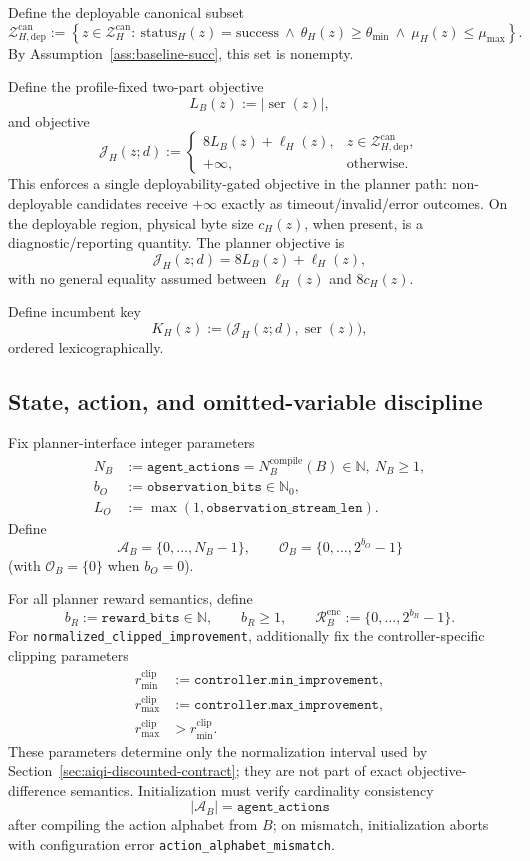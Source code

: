 \documentclass[11pt]{article}
\begin{document}
Define the deployable canonical subset
\[
\mathcal{Z}_{H,\mathrm{dep}}^{\mathrm{can}}:=
\left\{z\in\mathcal{Z}_H^{\mathrm{can}}:\ \mathrm{status}_H(z)=\mathrm{success}\ \land\ \theta_H(z)\ge\theta_{\min}\ \land\ \mu_H(z)\le\mu_{\max}\right\}.
\]
By Assumption~\ref{ass:baseline-succ}, this set is nonempty.

Define the profile-fixed two-part objective
\[
L_B(z):=\big|\operatorname{ser}(z)\big|,
\]
and objective
\[
\mathcal{J}_H(z;d):=
\begin{cases}
8L_B(z)+\ell_H(z),
& z\in\mathcal{Z}_{H,\mathrm{dep}}^{\mathrm{can}},\\[3pt]
+\infty,
& \text{otherwise.}
\end{cases}
\]
This enforces a single deployability-gated objective in the planner path:
non-deployable candidates receive $+\infty$ exactly as timeout/invalid/error
outcomes. On the deployable region, physical byte size $c_H(z)$, when present,
is a diagnostic/reporting quantity. The planner objective is
\[
\mathcal{J}_H(z;d)=8L_B(z)+\ell_H(z),
\]
with no general equality assumed between $\ell_H(z)$ and $8c_H(z)$.

Define incumbent key
\[
K_H(z):=\big(\mathcal{J}_H(z;d),\operatorname{ser}(z)\big),
\]
ordered lexicographically.

\subsection{State, action, and omitted-variable discipline}

Fix planner-interface integer parameters
\[
\begin{aligned}
N_B&:=\texttt{agent\_actions}=N_B^{\mathrm{compile}}(B)\in\mathbb{N},\ N_B\ge 1,\\
b_O&:=\texttt{observation\_bits}\in\mathbb{N}_0,\\
L_O&:=\max(1,\texttt{observation\_stream\_len}).
\end{aligned}
\]
Define
\[
\mathcal{A}_B=\{0,\dots,N_B-1\},
\qquad
\mathcal{O}_B=\{0,\dots,2^{b_O}-1\}
\]
(with $\mathcal{O}_B=\{0\}$ when $b_O=0$).

For all planner reward semantics, define
\[
b_R:=\texttt{reward\_bits}\in\mathbb{N},\qquad b_R\ge 1,
\qquad
\mathcal{R}_B^{\mathrm{enc}}:=\{0,\dots,2^{b_R}-1\}.
\]
For \texttt{normalized\_clipped\_improvement}, additionally fix the
controller-specific clipping parameters
\[
\begin{aligned}
r_{\min}^{\mathrm{clip}}&:=\texttt{controller.min\_improvement},\\
r_{\max}^{\mathrm{clip}}&:=\texttt{controller.max\_improvement},\\
r_{\max}^{\mathrm{clip}}&>r_{\min}^{\mathrm{clip}}.
\end{aligned}
\]
These parameters determine only the normalization interval used by
Section~\ref{sec:aiqi-discounted-contract}; they are not part of exact
objective-difference semantics.
Initialization must verify cardinality consistency
\[
|\mathcal{A}_B|=\texttt{agent\_actions}
\]
after compiling the action alphabet from $B$; on mismatch, initialization aborts
with configuration error \texttt{action\_alphabet\_mismatch}.
\end{document}
